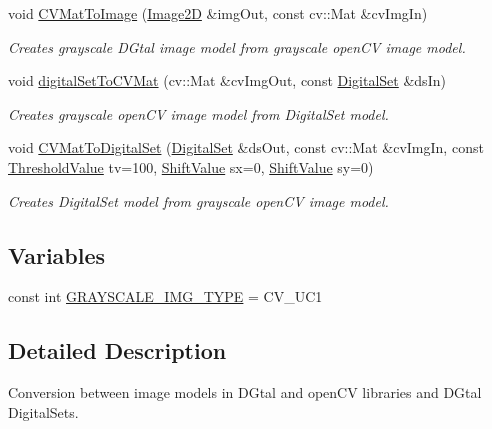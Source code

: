 \begin{DoxyCompactItemize}
void \hyperlink{namespaceDIPaCUS_1_1Representation_a21b3320f4db6e9be9b4ef3dc09c98afa}{C\+V\+Mat\+To\+Image} (\hyperlink{namespaceDIPaCUS_1_1Representation_ae97917e89f57298fda1626daad9f1733}{Image2D} \&img\+Out, const cv\+::\+Mat \&cv\+Img\+In)
\begin{DoxyCompactList}\small\item\em Creates grayscale D\+Gtal image model from grayscale open\+CV image model. \end{DoxyCompactList}\item 
void \hyperlink{namespaceDIPaCUS_1_1Representation_ad8ad6c44d5f4a4f7033fac84899bb3fa}{digital\+Set\+To\+C\+V\+Mat} (cv\+::\+Mat \&cv\+Img\+Out, const \hyperlink{namespaceDIPaCUS_1_1Representation_a6eca0b4fa262f2d600f11d82ee10b5a6}{Digital\+Set} \&ds\+In)
\begin{DoxyCompactList}\small\item\em Creates grayscale open\+CV image model from Digital\+Set model. \end{DoxyCompactList}\item 
void \hyperlink{namespaceDIPaCUS_1_1Representation_a30987a074b773f7b4091b133a806618d}{C\+V\+Mat\+To\+Digital\+Set} (\hyperlink{namespaceDIPaCUS_1_1Representation_a6eca0b4fa262f2d600f11d82ee10b5a6}{Digital\+Set} \&ds\+Out, const cv\+::\+Mat \&cv\+Img\+In, const \hyperlink{namespaceDIPaCUS_1_1Representation_a85996f90f0c4186ddae15b4f372bf875}{Threshold\+Value} tv=100, \hyperlink{namespaceDIPaCUS_1_1Representation_a6e7d323cc6acfe6cd461f28a986351f5}{Shift\+Value} sx=0, \hyperlink{namespaceDIPaCUS_1_1Representation_a6e7d323cc6acfe6cd461f28a986351f5}{Shift\+Value} sy=0)
\begin{DoxyCompactList}\small\item\em Creates Digital\+Set model from grayscale open\+CV image model. \end{DoxyCompactList}\end{DoxyCompactItemize}
\subsection*{Variables}
\begin{DoxyCompactItemize}
\item 
const int \hyperlink{namespaceDIPaCUS_1_1Representation_ad86d37ae840297d40c79295d1c7e6e52}{G\+R\+A\+Y\+S\+C\+A\+L\+E\+\_\+\+I\+M\+G\+\_\+\+T\+Y\+PE} = C\+V\+\_\+U\+C1
\end{DoxyCompactItemize}


\subsection{Detailed Description}
Conversion between image models in D\+Gtal and open\+CV libraries and D\+Gtal Digital\+Sets. 

